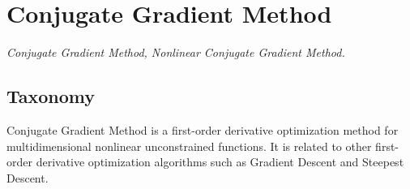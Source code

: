 

\section{Conjugate Gradient Method} 
\label{sec:conjugate_gradient}

\emph{Conjugate Gradient Method, Nonlinear Conjugate Gradient Method.}

\subsection{Taxonomy}
Conjugate Gradient Method is a first-order derivative optimization method for multidimensional nonlinear unconstrained functions.
It is related to other first-order derivative optimization algorithms such as Gradient Descent and Steepest Descent.


